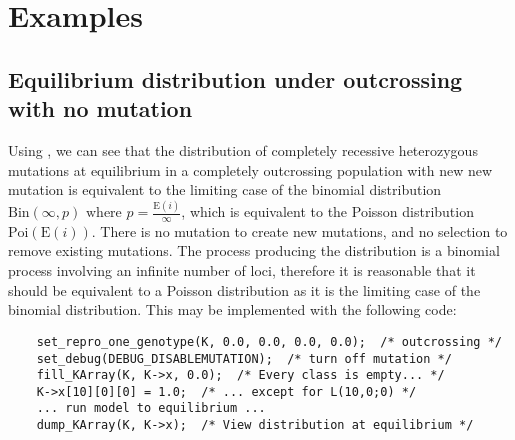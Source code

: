 \section{Examples}

\subsection{Equilibrium distribution under outcrossing with no mutation}

Using \K, we can see that the distribution of completely recessive heterozygous mutations at equilibrium in a completely outcrossing population with new new mutation is equivalent to the limiting case of the binomial distribution $\text{Bin}(\infty,p) \text{ where } p=\frac{\text{E}(i)}{\infty}$, which is equivalent to the Poisson distribution $\text{Poi}(\text{E}(i))$.  There is no mutation to create new mutations, and no selection to remove existing mutations.  The process producing the distribution is a binomial process involving an infinite number of loci, therefore it is reasonable that it should be equivalent to a Poisson distribution as it is the limiting case of the binomial distribution.  This may be implemented with the following code:

\singlespacing
\begin{verbatim}
    set_repro_one_genotype(K, 0.0, 0.0, 0.0, 0.0);  /* outcrossing */
    set_debug(DEBUG_DISABLEMUTATION);  /* turn off mutation */
    fill_KArray(K, K->x, 0.0);  /* Every class is empty... */
    K->x[10][0][0] = 1.0;  /* ... except for L(10,0;0) */
    ... run model to equilibrium ...
    dump_KArray(K, K->x);  /* View distribution at equilibrium */
\end{verbatim}
\doublespacing

